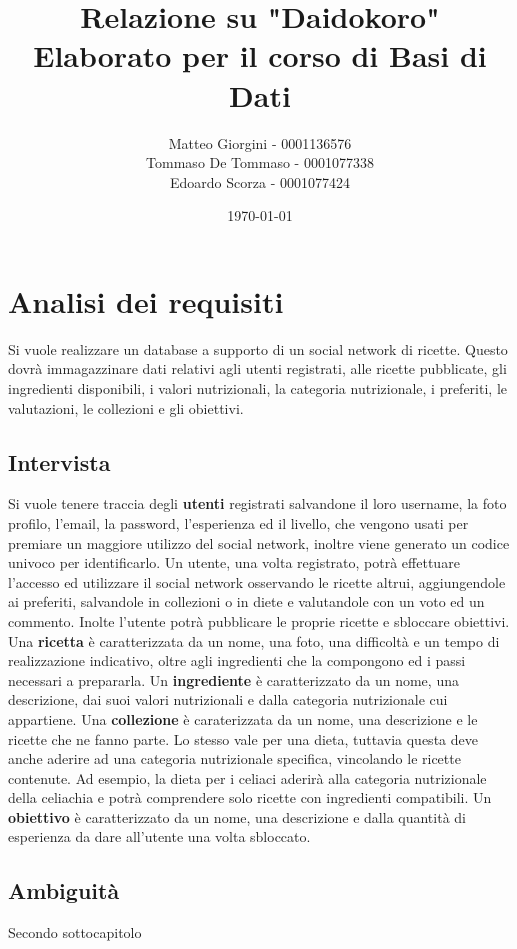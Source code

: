﻿\documentclass[a4paper,12pt]{report}
\title{Relazione su "Daidokoro" \\ Elaborato per il corso di Basi di Dati}
\author
{
    Matteo Giorgini - 0001136576 \\
    Tommaso De Tommaso - 0001077338 \\
    Edoardo Scorza - 0001077424 \\
}
\date{\today}
\begin{document}
\maketitle
\tableofcontents

\chapter{Analisi dei requisiti}
Si vuole realizzare un database a supporto di un social network di ricette.
Questo dovrà immagazzinare dati relativi agli utenti registrati, alle ricette pubblicate, gli ingredienti disponibili, i valori nutrizionali, la categoria nutrizionale, i preferiti, le valutazioni, le collezioni e gli obiettivi.

\section{Intervista}
Si vuole tenere traccia degli \textbf{utenti} registrati salvandone il loro username, la foto profilo, l'email, la password, l'esperienza ed il livello, che vengono usati per premiare un maggiore utilizzo del social network, inoltre viene generato un codice univoco per identificarlo. Un utente, una volta registrato, potrà effettuare l'accesso ed utilizzare il social network osservando le ricette altrui, aggiungendole ai preferiti, salvandole in collezioni o in diete e valutandole con un voto ed un commento. Inolte l'utente potrà pubblicare le proprie ricette e sbloccare obiettivi.
Una \textbf{ricetta} è caratterizzata da un nome, una foto, una difficoltà e un tempo di realizzazione indicativo, oltre agli ingredienti che la compongono ed i passi necessari a prepararla.
Un \textbf{ingrediente} è caratterizzato da un nome, una descrizione, dai suoi valori nutrizionali e dalla categoria nutrizionale cui appartiene.
Una \textbf{collezione} è caraterizzata da un nome, una descrizione e le ricette che ne fanno parte. Lo stesso vale per una dieta, tuttavia questa deve anche aderire ad una categoria nutrizionale specifica, vincolando le ricette contenute. Ad esempio, la dieta per i celiaci aderirà alla categoria nutrizionale della celiachia e potrà comprendere solo ricette con ingredienti compatibili.
Un \textbf{obiettivo} è caratterizzato da un nome, una descrizione e dalla quantità di esperienza da dare all'utente una volta sbloccato.

\section{Ambiguità}
Secondo sottocapitolo
\end{document}
